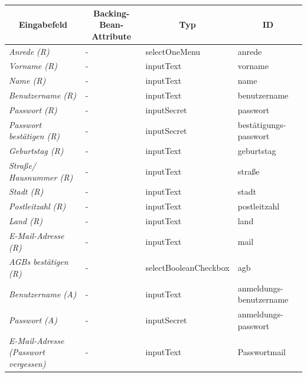\begin{itemize}
\begin{itemize}
\begin{center}
\begin{longtable}{|p{3cm} |p{5cm} | p{4cm}|p{3cm}|}
						\hline \multicolumn{1}{|c|}{\textbf{Eingabefeld}} & \multicolumn{1}{|c|}{\textbf{Backing-Bean-Attribute}} & \multicolumn{1}{|c|}{\textbf{Typ}}  &  \multicolumn{1}{|c|}{\textbf{ID}} \\ \hline
						\endfirsthead
						\hline
						\endlastfoot
							\textit{Anrede (R)} & - & selectOneMenu & anrede \\ \hline
							\textit{Vorname (R)} & - & inputText & vorname \\ \hline
							\textit{Name (R)} & - & inputText & name \\ \hline
							\textit{Benutzername (R)} & - & inputText & benutzername\\ \hline
							\textit{Passwort (R)} & - & inputSecret & passwort \\ \hline
							\textit{Passwort bestätigen (R)} &- & inputSecret & bestätigungs- passwort\\ \hline
							\textit{Geburtstag (R)} & - & inputText & geburtstag \\ \hline
							\textit{Straße/ Hausnummer (R)} & - & inputText & straße\\ \hline
							\textit{Stadt (R)} & - & inputText & stadt \\ \hline
							\textit{Postleitzahl (R)} & - & inputText & postleitzahl \\ \hline
							\textit{Land (R)} & - & inputText & land \\ \hline
							\textit{E-Mail-Adresse (R)} & - & inputText & mail\\ \hline
							\textit{AGBs bestätigen (R)} & - & selectBooleanCheckbox & agb \\ \hline
							\textit{Benutzername (A)} & - & inputText & anmeldungs- benutzername \\ \hline
							\textit{Passwort (A)} & - & inputSecret & anmeldungs- passwort \\ \hline
							\textit{E-Mail-Adresse (Passwort vergessen)} & - & inputText & Passwortmail \\ \hline
					\end{longtable}
				\end{center}
				
				\begin{center}
					\begin{longtable}{|p{3cm} |p{8cm} | p{5cm}|}
						

\end{longtable}
\end{center}
\end{itemize}
\end{itemize}
